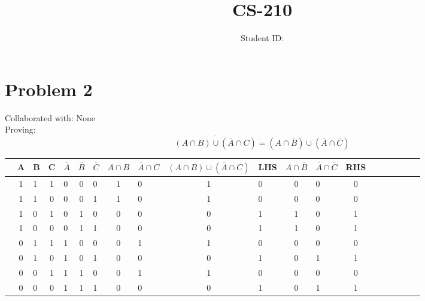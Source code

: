 \documentclass{article}
\title{CS-210 \hwNo}
\author{\myname \qquad Student ID: \myid}
\begin{document}
\maketitle
\section{Problem 2}
Collaborated with: None \\
Proving: $$\overline{(A \cap B)\cup (\overline{A}\cap C)} = (A \cap \overline{B})\cup (\overline{A} \cap \overline{C})$$ 
\begin{table}[h]
\begin{tabular}{lclclclclclclc|c|c|c|c|c|c|}
\hline
&A & B & C & $\overline{A}$&$\overline{B}$ & $\overline{C}$ & $A \cap B$ &$\overline{A} \cap C$ & $(A \cap B) \cup (\overline{A} \cap C)$ & LHS & $A \cap \overline{B}$ & $\overline{A} \cap \overline{C} $ & RHS\\ %
\hline
&1 & 1 & 1 & 0 & 0 & 0& 1 &\hspace{3mm}0 &1& \hspace{2mm}0& 0&\hspace{4mm}0&0 \\ 
\hline
&1 & 1 & 0 & 0 & 0 & 1 & 1 &\hspace{3mm}0 &1&\hspace{2mm}0&0&\hspace{4mm}0&0\\ 
\hline
&1 & 0 & 1 & 0 & 1 & 0 & 0 &\hspace{2mm} 0 &0&\hspace{2mm}1&1&\hspace{4mm}0&1\\ 
\hline
&1 & 0 & 0 & 0 & 1 &1 &0 &\hspace{2mm} 0&0&\hspace{2mm}1&1&\hspace{4mm}0&1 \\ 
\hline
&0 & 1 & 1 & 1 & 0 &0 & 0 &\hspace{3mm}1 &1&\hspace{2mm}0&0&\hspace{4mm}0&0\\ 
\hline
&0 & 1 & 0 & 1 & 0 & 1& 0 & \hspace{3mm}0 &0&\hspace{2mm}1&0&\hspace{4mm}1&1\\ 
\hline
&0& 0 &1 & 1 & 1 & 0 &0 & \hspace{3mm}1 &1&\hspace{2mm}0&0&\hspace{4mm}0&0 \\ 
\hline
&0& 0 & 0 & 1 &1& 1 &0 & \hspace{3mm}0&0&\hspace{2mm}1&0&\hspace{4mm}1&1
\end{tabular}
\end{table}
\end{document}
